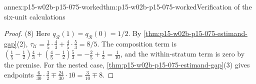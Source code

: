 \begin{annexitem}{annex:p15-w02b-p15-075-worked}{thm:p15-w02b-p15-075-worked}{Verification of the six-unit calculations}
\begin{proof}
(8) Here \(q_{\mathcal R}(1)=q_{\mathcal R}(0)=1/2\). By
\cref{thm:p15-w02b-p15-075-estimand-gap}(2),
\(\tau_{\mathcal U}=\tfrac15\cdot\tfrac43+\tfrac45\cdot\tfrac53=8/5\).
The composition term is
\((\tfrac15-\tfrac12)\tfrac43+(\tfrac45-\tfrac12)\tfrac53=-\tfrac25+\tfrac12=\tfrac1{10}\),
and the within-stratum term is zero by the premise. For the nested case,
\cref{thm:p15-w02b-p15-075-estimand-gap}(3) gives endpoints
\(\tfrac6{30}\cdot\tfrac32\mp\tfrac{24}{30}\cdot10=\tfrac3{10}\mp8\).
\end{proof}
\end{annexitem}
